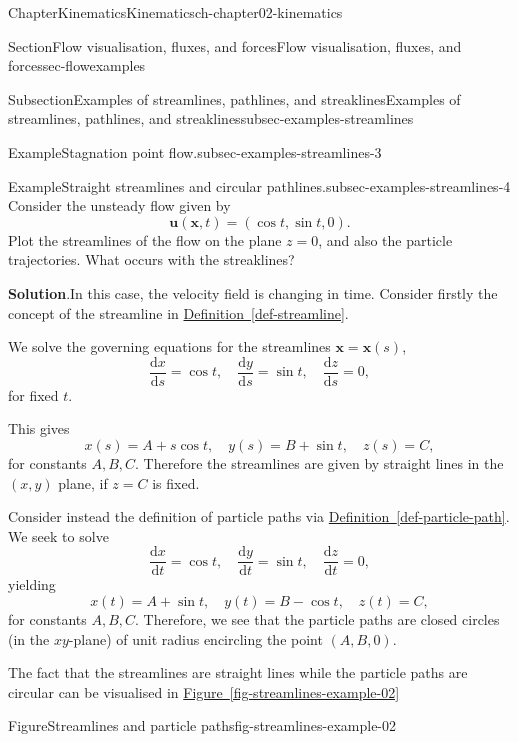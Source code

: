 \documentclass[oneside,10pt,]{book}
\newcommand{\blocktitlefont}{\relax}
\newcommand{\xreffont}{\relax}
\numberwithin{equation}{section}
\newcommand{\de}{\mathrm{d}}
\newcommand{\dd}[2]{\frac{\de#1}{\de#2}}
\newcommand{\bx}{\boldsymbol{x}}
\newcommand{\bu}{\boldsymbol{u}}
\begin{document}
\begin{chapterptx}{Chapter}{Kinematics}{}{Kinematics}{}{}{ch-chapter02-kinematics}
\begin{sectionptx}{Section}{Flow visualisation, fluxes, and forces}{}{Flow visualisation, fluxes, and forces}{}{}{sec-flowexamples}
\begin{subsectionptx}{Subsection}{Examples of streamlines, pathlines, and streaklines}{}{Examples of streamlines, pathlines, and streaklines}{}{}{subsec-examples-streamlines}
\begin{example}{Example}{Stagnation point flow.}{subsec-examples-streamlines-3}
\end{example}
\begin{example}{Example}{Straight streamlines and circular pathlines.}{subsec-examples-streamlines-4}%
Consider the unsteady flow given by%
\begin{equation*}
\bu(\bx, t) = (\cos t, \sin t, 0)\text{.}
\end{equation*}
Plot the streamlines of the flow on the plane \(z = 0\), and also the particle trajectories. What occurs with the streaklines?%
\par\smallskip%
\noindent\textbf{\blocktitlefont Solution}.\hypertarget{subsec-examples-streamlines-4-3}{}\quad{}In this case, the velocity field is changing in time. Consider firstly the concept of the streamline in \hyperref[def-streamline]{Definition~{\xreffont\ref{def-streamline}}}.%
\par
We solve the governing equations for the streamlines \(\bx = \bx(s)\),%
\begin{equation*}
\dd{x}{s} = \cos t, \quad \dd{y}{s} = \sin t, \quad \dd{z}{s} = 0,
\end{equation*}
for fixed \(t\).%
\par
This gives%
\begin{equation*}
x(s) = A + s \cos t, \quad y(s) = B + \sin t, \quad z(s) = C,
\end{equation*}
for constants \(A, B, C\). Therefore the streamlines are given by straight lines in the \((x,
y)\) plane, if \(z = C\) is fixed.%
\par
Consider instead the definition of particle paths via \hyperref[def-particle-path]{Definition~{\xreffont\ref{def-particle-path}}}. We seek to solve%
\begin{equation*}
\dd{x}{t} = \cos t, \quad \dd{y}{t} = \sin t, \quad \dd{z}{t} = 0,
\end{equation*}
yielding%
\begin{equation*}
x(t) = A + \sin t, \quad y(t) = B - \cos t, \quad z(t) = C,
\end{equation*}
for constants \(A, B, C\). Therefore, we see that the particle paths are closed circles (in the \(xy\)-plane) of unit radius encircling the point \((A, B, 0)\).%
\par
The fact that the streamlines are straight lines while the particle paths are circular can be visualised in \hyperref[fig-streamlines-example-02]{Figure~{\xreffont\ref{fig-streamlines-example-02}}}%
\begin{figureptx}{Figure}{Streamlines and particle paths}{fig-streamlines-example-02}{}%

\end{figureptx}
\end{example}
\end{subsectionptx}
\end{sectionptx}
\end{chapterptx}
\end{document}
